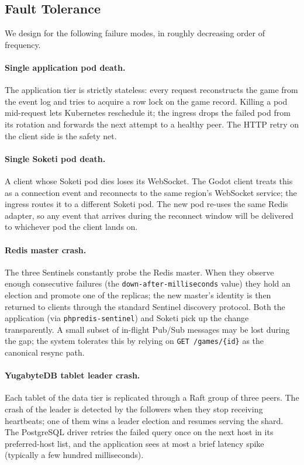 \documentclass{scrartcl}
\begin{document}
\subsection{Fault Tolerance}\label{fault-tolerance}

We design for the following failure modes, in roughly decreasing order
of frequency.

\paragraph{Single application pod death.} The application tier is
strictly stateless: every request reconstructs the game from the event
log and tries to acquire a row lock on the game record. Killing a pod
mid-request lets Kubernetes reschedule it; the ingress drops the
failed pod from its rotation and forwards the next attempt to a
healthy peer. The HTTP retry on the client side is the safety net.

\paragraph{Single Soketi pod death.} A client whose Soketi pod dies
loses its WebSocket. The Godot client treats this as a connection
event and reconnects to the same region's WebSocket service; the
ingress routes it to a different Soketi pod. The new pod re-uses the
same Redis adapter, so any event that arrives during the reconnect
window will be delivered to whichever pod the client lands on.

\paragraph{Redis master crash.} The three Sentinels constantly probe
the Redis master. When they observe enough consecutive failures (the
\texttt{down-after-milliseconds} value) they hold an election and
promote one of the replicas; the new master's identity is then
returned to clients through the standard Sentinel discovery protocol.
Both the application (via \texttt{phpredis-sentinel}) and Soketi pick
up the change transparently. A small subset of in-flight Pub/Sub
messages may be lost during the gap; the system tolerates this by
relying on \texttt{GET /games/\{id\}} as the canonical resync path.

\paragraph{YugabyteDB tablet leader crash.} Each tablet of the data
tier is replicated through a Raft group of three peers. The crash of
the leader is detected by the followers when they stop receiving
heartbeats; one of them wins a leader election and resumes serving the
shard. The PostgreSQL driver retries the failed query once on the next
host in its preferred-host list, and the application sees at most a
brief latency spike (typically a few hundred milliseconds).
\end{document}
